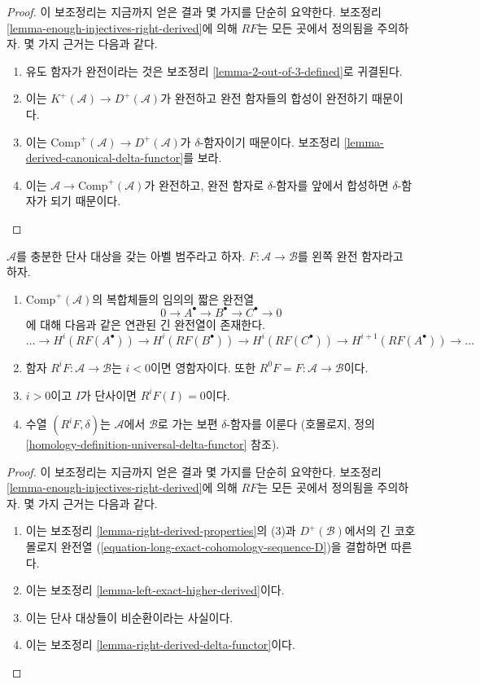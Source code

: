 \begin{proof}
이 보조정리는 지금까지 얻은 결과 몇 가지를 단순히 요약한다.
보조정리 \ref{lemma-enough-injectives-right-derived}에 의해
$RF$는 모든 곳에서 정의됨을 주의하자. 몇 가지 근거는 다음과 같다.
\begin{enumerate}
\item 유도 함자가 완전이라는 것은 보조정리
\ref{lemma-2-out-of-3-defined}로 귀결된다.
\item 이는 $K^{+}(\mathcal{A}) \to D^{+}(\mathcal{A})$가 완전하고
완전 함자들의 합성이 완전하기 때문이다.
\item 이는 $\text{Comp}^{+}(\mathcal{A}) \to D^{+}(\mathcal{A})$가
$\delta$-함자이기 때문이다. 보조정리
\ref{lemma-derived-canonical-delta-functor}를 보라.
\item 이는 $\mathcal{A} \to \text{Comp}^{+}(\mathcal{A})$가 완전하고,
완전 함자로 $\delta$-함자를 앞에서 합성하면 $\delta$-함자가 되기 때문이다.
\end{enumerate}
\end{proof}

\begin{lemma}
\label{lemma-higher-derived-functors}
$\mathcal{A}$를 충분한 단사 대상을 갖는 아벨 범주라고 하자.
$F : \mathcal{A} \to \mathcal{B}$를 왼쪽 완전 함자라고 하자.
\begin{enumerate}
\item $\text{Comp}^{+}(\mathcal{A})$의 복합체들의 임의의 짧은 완전열
$$
0 \to A^\bullet \to B^\bullet \to C^\bullet \to 0
$$
에 대해 다음과 같은 연관된 긴 완전열이 존재한다.
$$
\ldots \to
H^i(RF(A^\bullet)) \to
H^i(RF(B^\bullet)) \to
H^i(RF(C^\bullet)) \to
H^{i + 1}(RF(A^\bullet)) \to \ldots
$$
\item 함자 $R^iF : \mathcal{A} \to \mathcal{B}$는 $i < 0$이면 영함자이다.
또한 $R^0F = F : \mathcal{A} \to \mathcal{B}$이다.
\item $i > 0$이고 $I$가 단사이면 $R^iF(I) = 0$이다.
\item 수열 $(R^iF, \delta)$는 $\mathcal{A}$에서 $\mathcal{B}$로 가는
보편 $\delta$-함자를 이룬다 (호몰로지, 정의
\ref{homology-definition-universal-delta-functor} 참조).
\end{enumerate}
\end{lemma}

\begin{proof}
이 보조정리는 지금까지 얻은 결과 몇 가지를 단순히 요약한다.
보조정리 \ref{lemma-enough-injectives-right-derived}에 의해
$RF$는 모든 곳에서 정의됨을 주의하자. 몇 가지 근거는 다음과 같다.
\begin{enumerate}
\item 이는 보조정리 \ref{lemma-right-derived-properties}의 (3)과
$D^{+}(\mathcal{B})$에서의 긴 코호몰로지 완전열
(\ref{equation-long-exact-cohomology-sequence-D})을 결합하면 따른다.
\item 이는 보조정리 \ref{lemma-left-exact-higher-derived}이다.
\item 이는 단사 대상들이 비순환이라는 사실이다.
\item 이는 보조정리 \ref{lemma-right-derived-delta-functor}이다.
\end{enumerate}
\end{proof}

